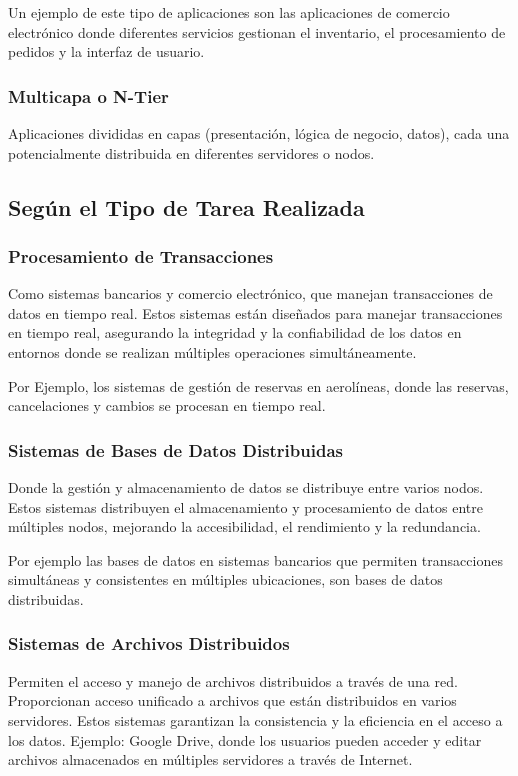 Un ejemplo de este tipo de aplicaciones son las aplicaciones de comercio electrónico donde diferentes servicios gestionan el inventario, el procesamiento de pedidos y la interfaz de usuario.

\subsubsection{Multicapa o N-Tier}
Aplicaciones divididas en capas (presentación, lógica de negocio, datos), cada una potencialmente distribuida en diferentes servidores o nodos.

\subsection{Según el Tipo de Tarea Realizada}

\subsubsection{Procesamiento de Transacciones}
Como sistemas bancarios y comercio electrónico, que manejan transacciones de datos en tiempo real. Estos sistemas están diseñados para manejar transacciones en tiempo real, asegurando la integridad y la confiabilidad de los datos en entornos donde se realizan múltiples operaciones simultáneamente.

Por Ejemplo, los sistemas de gestión de reservas en aerolíneas, donde las reservas, cancelaciones y cambios se procesan en tiempo real.

\subsubsection{Sistemas de Bases de Datos Distribuidas} 
Donde la gestión y almacenamiento de datos se distribuye entre varios nodos. Estos sistemas distribuyen el almacenamiento y procesamiento de datos entre múltiples nodos, mejorando la accesibilidad, el rendimiento y la redundancia.

Por ejemplo las bases de datos en sistemas bancarios que permiten transacciones simultáneas y consistentes en múltiples ubicaciones, son bases de datos distribuidas.

\subsubsection{Sistemas de Archivos Distribuidos}
Permiten el acceso y manejo de archivos distribuidos a través de una red. Proporcionan acceso unificado a archivos que están distribuidos en varios servidores. Estos sistemas garantizan la consistencia y la eficiencia en el acceso a los datos. Ejemplo: Google Drive, donde los usuarios pueden acceder y editar archivos almacenados en múltiples servidores a través de Internet.

